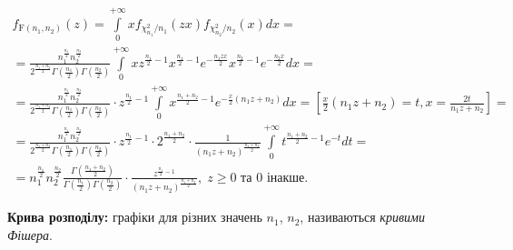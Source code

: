 \begin{gather*}
    f_{\mathrm{F}(n_1, n_2)} (z) = \int\limits_0^{+\infty} x f_{\chi_{n_1}^2/n_1}(zx) f_{\chi_{n_2}^2/n_2}(x) dx = \\
    = \frac{n_1^{\frac{n_1}{2}} n_2^{\frac{n_2}{2}}}{2^{\frac{n_1+n_2}{2}} \Gamma\left(\frac{n_1}{2}\right) \Gamma\left(\frac{n_2}{2}\right)}
    \int\limits_0^{+\infty} x z^{\frac{n_1}{2} - 1} x^{\frac{n_1}{2} - 1} e^{-\frac{n_1 zx}{2}} x^{\frac{n_2}{2} - 1} e^{-\frac{n_2 x}{2}} dx = \\
    = \frac{n_1^{\frac{n_1}{2}} n_2^{\frac{n_2}{2}}}{2^{\frac{n_1+n_2}{2}} \Gamma\left(\frac{n_1}{2}\right) \Gamma\left(\frac{n_2}{2}\right)} \cdot
    z^{\frac{n_1}{2} - 1} \int\limits_0^{+\infty} x^{\frac{n_1 + n_2}{2} - 1} e^{-\frac{x}{2}(n_1 z + n_2)} dx =
    \left[ \frac{x}{2}(n_1 z + n_2) = t, x = \frac{2t}{n_1 z + n_2}\right] = \\
    = \frac{n_1^{\frac{n_1}{2}} n_2^{\frac{n_2}{2}}}{2^{\frac{n_1+n_2}{2}} \Gamma\left(\frac{n_1}{2}\right) \Gamma\left(\frac{n_2}{2}\right)} \cdot
    z^{\frac{n_1}{2} - 1} \cdot 2^{\frac{n_1+n_2}{2}} \cdot \frac{1}{(n_1 z + n_2)^{\frac{n_1+n_2}{2}}}
    \int\limits_0^{+\infty} t^{\frac{n_1+n_2}{2} - 1} e^{-t} dt = \\
    = n_1^{\frac{n_1}{2}} n_2^{\frac{n_2}{2}} \frac{\Gamma\left(\frac{n_1+n_2}{2}\right)}{\Gamma\left(\frac{n_1}{2}\right) \Gamma\left(\frac{n_2}{2}\right)} \cdot
    \frac{z^{\frac{n_1}{2} - 1}}{(n_1 z + n_2)^{\frac{n_1+n_2}{2}}}, \; z \geq 0 \text{ та } 0 \text{ інакше}.
\end{gather*}

\noindent \textbf{Крива розподілу:} графіки для різних значень $n_1$, $n_2$, називаються \emph{кривими Фішера}.

\begin{center}
\end{center}

